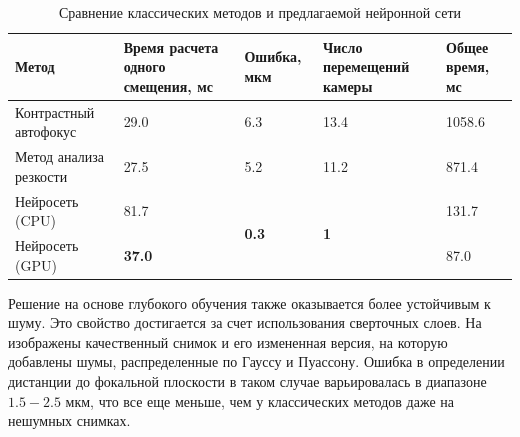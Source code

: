 \begin{table}[!htbp]
	\centering
	\small
	\begin{tabular}{|m{3cm}<{\centering}|m{3cm}<{\centering}|m{3cm}<{\centering}|m{3cm}<{\centering}|m{3cm}<{\centering}|}
		\hline
		Метод& Время расчета одного смещения, мс & Ошибка, мкм & Число перемещений камеры & Общее время, мс \\\hline
		Контрастный автофокус & 29.0 & 6.3 & 13.4 & 1058.6\\\hline
		Метод анализа резкости & 27.5 & 5.2 & 11.2 & 871.4 \\\hline
		Нейросеть (CPU) & 81.7 & \multirow{2}{*}{\textbf{0.3}} & \multirow{2}{*}{\textbf{1}} & 131.7 \\\cline{1-2} \cline{5-5}
		Нейросеть (GPU) & \textbf{37.0} &  &  & 87.0 \\\hline
	\end{tabular}
	\caption{Сравнение классических методов и предлагаемой нейронной сети}
	\label{tab:Comparison_FocuesNet}
\end{table}

Решение на основе глубокого обучения также оказывается более устойчивым к шуму. Это свойство достигается за счет использования сверточных слоев. На  изображены качественный снимок и его измененная версия, на которую добавлены шумы, распределенные по Гауссу и Пуассону. Ошибка в определении дистанции до фокальной плоскости в таком случае варьировалась в диапазоне $1.5-2.5$ мкм, что все еще меньше, чем у классических методов даже на нешумных снимках.

